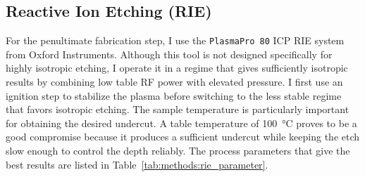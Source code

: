     \subsection*{Reactive Ion Etching (RIE)}

        For the penultimate fabrication step, I use the \texttt{PlasmaPro 80} ICP RIE system from Oxford Instruments. Although this tool is not designed specifically for highly isotropic etching, I operate it in a regime that gives sufficiently isotropic results by combining low table RF power with elevated pressure. I first use an ignition step to stabilize the plasma before switching to the less stable regime that favors isotropic etching. The sample temperature is particularly important for obtaining the desired undercut. A table temperature of \qty{100}{\degreeCelsius} proves to be a good compromise because it produces a sufficient undercut while keeping the etch slow enough to control the depth reliably. The process parameters that give the best results are listed in Table~\ref{tab:methods:rie_parameter}.

